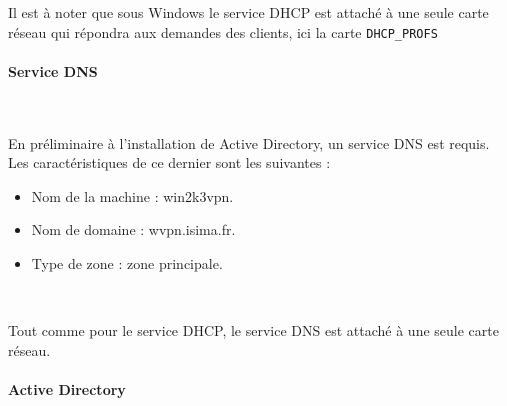 Il est à noter que sous Windows le service DHCP est attaché à une seule carte réseau qui répondra aux demandes des clients, ici la carte \verb|DHCP_PROFS|




\paragraph{Service DNS}
~

En préliminaire à l'installation de Active Directory, un service DNS est requis. Les caractéristiques de ce dernier sont les suivantes :
\begin{itemize}
	\item Nom de la machine : win2k3vpn.
	\item Nom de domaine : wvpn.isima.fr.
	\item Type de zone : zone principale.
\end{itemize}
~


% 

Tout comme pour le service DHCP, le service DNS est attaché à une seule carte réseau.


\paragraph{Active Directory}
~

